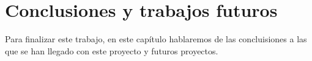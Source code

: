 \chapter{Conclusiones y trabajos futuros}\label{conclusion}
Para finalizar este trabajo, en este capítulo hablaremos de las concluisiones a las que se han llegado con este proyecto y futuros proyectos.
